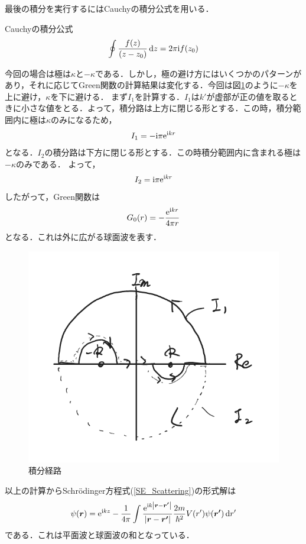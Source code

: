 \documentclass{report}
\begin{document}
  最後の積分を実行するにはCauchyの積分公式を用いる．
  \begin{itembox}[l]{Cauchyの積分公式}
    \begin{equation}
      \oint \frac{f(z)}{(z-z_0)}\dd{z} = 2\pi \mathrm{i} f(z_0)
    \end{equation}
  \end{itembox}
  今回の場合は極は$\kappa$と$-\kappa$である．しかし，極の避け方にはいくつかのパターンがあり，それに応じてGreen関数の計算結果は変化する．今回は図\ref{Integral}のように$-\kappa$を上に避け，$\kappa$を下に避ける．
  まず$I_1$を計算する．$I_1$は$k'$が虚部が正の値を取るときに小さな値をとる．よって，積分路は上方に閉じる形とする．この時，積分範囲内に極は$\kappa$のみになるため，
  \begin{align}
    I_1 = -\mathrm{i}\pi\mathrm{e}^{\mathrm{i} kr}
  \end{align}
  となる．$I_2$の積分路は下方に閉じる形とする．この時積分範囲内に含まれる極は$-\kappa$のみである．
  よって，
  \begin{align}
    I_2 = \mathrm{i}\pi\mathrm{e}^{\mathrm{i} kr}
  \end{align}
  したがって，Green関数は
  \begin{align}
    G_0(r) = -\frac{\mathrm{e}^{\mathrm{i} kr}}{4\pi r}
  \end{align}
  となる．これは外に広がる球面波を表す．

  \begin{figure}[htbp]
    \centering
    \includegraphics[width=0.5\columnwidth]{scattering/scattering_QM/IntegralGreen.pdf}
    \caption{積分経路}
    \label{Integral}
  \end{figure}

  以上の計算からSchrödinger方程式(\ref{SE_Scattering})の形式解は
  \begin{align}
    \label{keishiki}
    \psi(\bm{r}) = \mathrm{e}^{\mathrm{i} kz} - \frac{1}{4\pi} \int \frac{\mathrm{e}^{\mathrm{i} k \abs{\bm{r} - \bm{r'}}}}{\abs{\bm{r} - \bm{r'}}} \frac{2m}{\hbar^2}V(r')\psi(\bm{r'}) \dd{r'}
  \end{align}
  である．これは平面波と球面波の和となっている．
\end{document}

